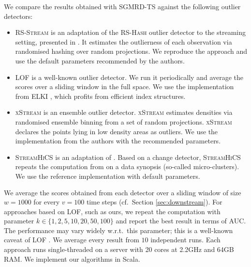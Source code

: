 We compare the results obtained with \textsc{\gls{SGMRD}-\gls{TS}} against the following outlier detectors: 
\begin{itemize}[noitemsep]
	\item \textsc{\acrshort{RS-Stream}} is an adaptation of the \textsc{\acrshort{RS-Hash}} \cite{DBLP:conf/icdm/SatheA16} outlier detector to the streaming setting, presented in \cite{DBLP:journals/kais/SatheA18}. It estimates the outlierness of each observation via randomised hashing over random projections. We reproduce the approach and use the default parameters recommended by the authors. 
	\item \textsc{\gls{LOF}} \cite{DBLP:conf/sigmod/BreunigKNS00} is a well-known outlier detector. We run it periodically and average the scores over a sliding window in the full space. We use the implementation from ELKI
	\cite{DBLP:journals/pvldb/SchubertKEZSZ15}, which profits from efficient index structures.%
	\item \textsc{xStream} \cite{10.1145/3219819.3220107} is an ensemble outlier detector. \textsc{xStream} estimates densities via randomised ensemble binning  from a set of random projections. \textsc{xStream} declares the points lying in low density areas as outliers. We use the implementation from the authors  %
	with the recommended parameters. 
	\item \textsc{Stream\acrshort{HiCS}} \cite{becker2016concept} is an adaptation of \cite{DBLP:conf/icde/KellerMB12}. Based on a change detector, \textsc{Stream\acrshort{HiCS}} repeats the computation from \cite{DBLP:conf/icde/KellerMB12} on a data synopsis (so-called micro-clusters). We use the reference implementation  %
	with default parameters. 
\end{itemize}

We average the scores obtained from each detector over a sliding window of size $w=1000$ for every $v=100$ time steps (cf.\ Section \ref{sec:downstream}). 
For approaches based on \gls{LOF}, such as ours, we repeat the computation with parameter $k \in \{1,2,5,10,20,50,100\}$ and report the best result in terms of  \acrshort{AUC}. 
The performance may vary widely w.r.t.\ this parameter; this is a well-known caveat of \gls{LOF} \cite{DBLP:journals/datamine/CamposZSCMSAH16}. 
We average every result from $10$ independent runs. 
Each approach runs single-threaded on a server with 20 cores at 2.2GHz and 64GB RAM. 
We implement our algorithms in Scala.%

